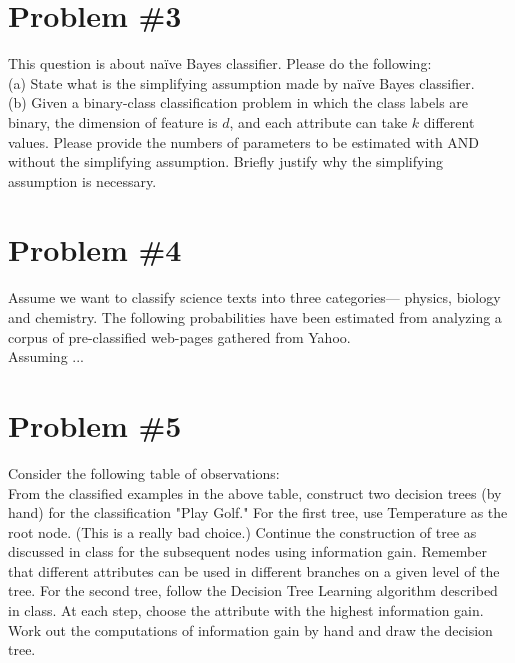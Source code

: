 \documentclass[12pt]{article}
\begin{document}
	\section*{Problem \#3}
	This question is about naïve Bayes classifier. Please do the following: \\
	(a) State what is the simplifying assumption made by naïve Bayes classifier. \\
	(b) Given a binary-class  classification  problem  in  which the  class  labels  are  binary,  the  dimension  of feature is $d$, and each attribute can take $k$ different values. Please provide the numbers of parameters to  be  estimated  with  AND  without  the  simplifying  assumption. Briefly  justify  why the  simplifying assumption is necessary. \\
	
	
	\section*{Problem \#4}
	Assume we want to classify science texts into three categories— physics, biology and chemistry. The  following  probabilities  have  been  estimated  from  analyzing  a  corpus  of  pre-classified  web-pages gathered from Yahoo. \\
	Assuming ... \\
	
	\section*{Problem \#5}
	Consider the following table of observations: \\
	From the classified examples in the above table, construct two decision trees (by hand) for the classification "Play Golf." For the  first tree, use Temperature as the root node. (This  is
	a really bad  choice.) Continue the construction  of  tree  as  discussed  in  class  for  the  subsequent  nodes using information  gain. Remember  that different attributes can be used in different branches on a given level of the tree. For the second tree, follow the  Decision Tree Learning  algorithm described  in class. At  each step,  choose  the  attribute  with  the  highest information gain. Work out the computations of information gain by hand and draw the decision tree.
	
\end{document}
